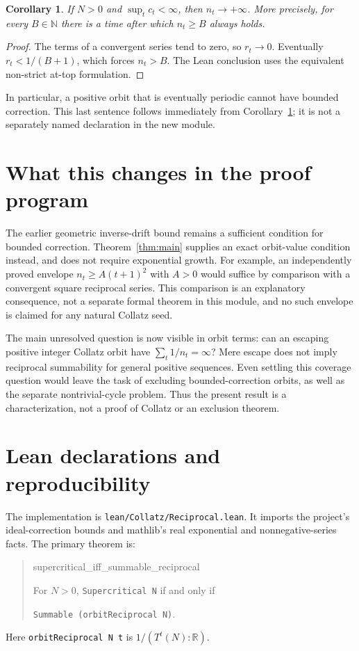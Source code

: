 \documentclass[11pt]{article}
\newtheorem{corollary}[theorem]{Corollary}
\newcommand{\R}{\mathbb R}
\newcommand{\N}{\mathbb N}
\begin{document}
\begin{corollary}\label{cor:escape}
If $N>0$ and $\sup_t c_t<\infty$, then $n_t\to+\infty$. More precisely, for every $B\in\N$ there is a time after which $n_t\ge B$ always holds.
\end{corollary}
\begin{proof}
The terms of a convergent series tend to zero, so $r_t\to0$. Eventually $r_t<1/(B+1)$, which forces $n_t>B$. The Lean conclusion uses the equivalent non-strict at-top formulation.
\end{proof}
In particular, a positive orbit that is eventually periodic cannot have bounded correction. This last sentence follows immediately from Corollary~\ref{cor:escape}; it is not a separately named declaration in the new module.

\section{What this changes in the proof program}
The earlier geometric inverse-drift bound remains a sufficient condition for bounded correction. Theorem~\ref{thm:main} supplies an exact orbit-value condition instead, and does not require exponential growth. For example, an independently proved envelope $n_t\ge A(t+1)^2$ with $A>0$ would suffice by comparison with a convergent square reciprocal series. This comparison is an explanatory consequence, not a separate formal theorem in this module, and no such envelope is claimed for any natural Collatz seed.

The main unresolved question is now visible in orbit terms: can an escaping positive integer Collatz orbit have $\sum_t1/n_t=\infty$? Mere escape does not imply reciprocal summability for general positive sequences. Even settling this coverage question would leave the task of excluding bounded-correction orbits, as well as the separate nontrivial-cycle problem. Thus the present result is a characterization, not a proof of Collatz or an exclusion theorem.

\newpage
\section{Lean declarations and reproducibility}
The implementation is \texttt{lean/Collatz/Reciprocal.lean}. It imports the project's ideal-correction bounds and mathlib's real exponential and nonnegative-series facts. The primary theorem is:
\begin{quote}\small\ttfamily
supercritical\_iff\_summable\_reciprocal\par
\normalfont For $N>0$, \texttt{Supercritical N} if and only if\par
\texttt{Summable (orbitReciprocal N)}.
\end{quote}
Here \texttt{orbitReciprocal N t} is $1/(T^t(N):\R)$.
\end{document}
